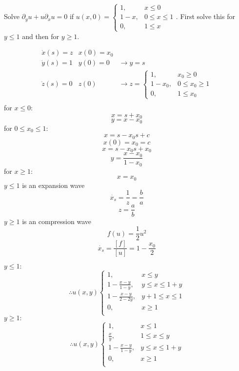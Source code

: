\documentclass[12pt]{exam}
\newcommand{\px}{\partial_x}
\newcommand{\py}{\partial_y}
\begin{document}
\begin{questions}
\newpage 
\question Solve $\py u + u \px u = 0$ if 
$u(x,0) = \begin{cases}1, &x\leq 0\\ 1-x,& 0\leq x \leq 1\\ 0,& 1\leq x\end{cases}$. 
First solve this for $y\leq 1$ and then for $y\geq 1$.
\begin{solutionorbox}[\stretch{1}]
$$
\begin{matrix}
  \Dot{x}(s) =z & x(0) = x_0 &\\
  \Dot{y}(s) = 1 & y(0) = 0 &\rightarrow y = s \\
  \Dot{z}(s) = 0 & z(0) & \rightarrow z = \begin{cases}1, & x_0\geq 0\\ 
      1-x_0, & 0 \leq x_0\geq 1\\0, &1\leq x_0\end{cases}\\
\end{matrix}
$$
for $x\leq 0$:
\[x = s+ x_0\]
\[y = x-x_0\]
for $0\leq x_0 \leq 1$:
\[x = s-x_0s + c\]
\[x(0) = x_0 = c\]
\[x = s-x_0s + x_0\]
\[y = \frac{x-x_0}{1-x_0}\]
for $x\geq 1$:
\[x = x_0\]
$y\leq 1$ is an expansion wave
\[\Dot{x_s} = \frac{1}{z} = \frac{b}{a}\]
\[z = \frac{a}{b}\]
$y\geq 1$ is an compression wave
\[f(u) = \frac{1}{2}u^2\]
\[\Dot{x_s} = \frac{[f]}{[u]} = 1-\frac{x_0}{2}\]

$y \leq 1:$
\[\therefore u(x,y) \begin{cases}1, & x\leq y\\ 
1-\frac{x-y}{1-y},&y \leq x \leq 1+y\\
1-\frac{x-y}{2-2y},&y+1 \leq x \leq 1\\
0, &x\geq 1\\
\end{cases}\]
$y \geq 1:$
\[\therefore u(x,y) \begin{cases}1, & x\leq 1\\ 
\frac{x}{y},&1 \leq x \leq y\\
1-\frac{x-y}{1-y},&y \leq x \leq 1+y\\
0, &x\geq 1\\
\end{cases}\]
\end{solutionorbox}
\end{questions}
\end{document}
